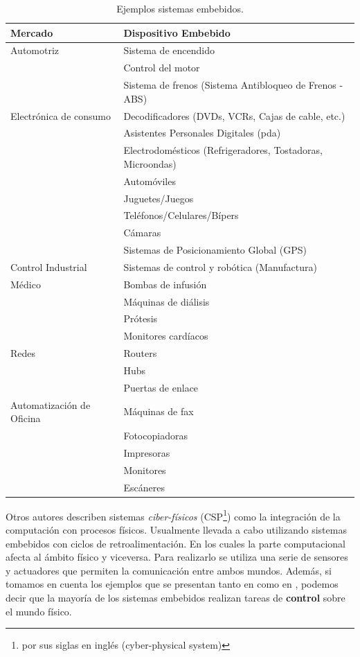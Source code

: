 \begin{table}[h]
\caption{Ejemplos sistemas embebidos.}
    \centering
    \label{tab:ejSistEmbebidos}
    \begin{tabular}{|l|l|}
        \hline
        \textbf{Mercado} & \textbf{Dispositivo Embebido} \\ \hline
        Automotriz & Sistema de encendido \\ 
        & Control del motor \\ 
        & Sistema de frenos (Sistema Antibloqueo de Frenos - ABS) \\ \hline
        Electrónica de consumo & Decodificadores (DVDs, VCRs, Cajas de cable, etc.) \\ 
        & Asistentes Personales Digitales (\gls{pda}) \\ 
        & Electrodomésticos (Refrigeradores, Tostadoras, Microondas) \\ 
        & Automóviles \\ 
        & Juguetes/Juegos \\ 
        & Teléfonos/Celulares/Bípers \\ 
        & Cámaras \\ 
        & Sistemas de Posicionamiento Global (GPS) \\ \hline
        Control Industrial & Sistemas de control y robótica (Manufactura) \\ \hline
        Médico & Bombas de infusión \\ 
        & Máquinas de diálisis \\ 
        & Prótesis \\ 
        & Monitores cardíacos \\ \hline
        Redes & Routers \\ 
        & Hubs \\ 
        & Puertas de enlace \\ \hline
        Automatización de Oficina & Máquinas de fax \\ 
        & Fotocopiadoras \\ 
        & Impresoras \\ 
        & Monitores \\ 
        & Escáneres \\ \hline
    \end{tabular}
\end{table}

Otros autores \cite{lee2017introduction} describen sistemas \textit{ciber-físicos} (CSP\footnote{por sus siglas en inglés (cyber-physical system)}) como la integración de la computación con procesos físicos. Usualmente llevada a cabo utilizando sistemas embebidos con ciclos de retroalimentación. En los cuales la parte computacional afecta al ámbito físico y viceversa. Para realizarlo se utiliza una serie de sensores y actuadores que permiten la comunicación entre ambos mundos.
Además, si tomamos en cuenta los ejemplos que se presentan tanto en \cite{noergaard2005embedded} como en \cite{lee2017introduction}, podemos decir que la mayoría de los sistemas embebidos realizan tareas de \textbf{control} sobre el mundo físico.

